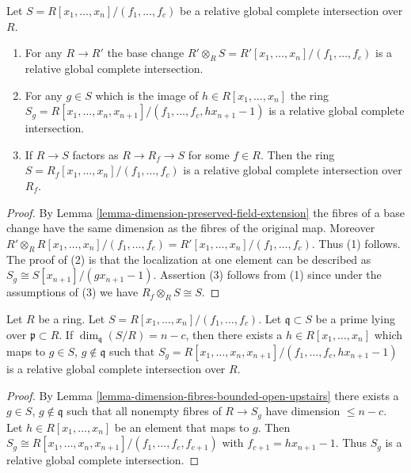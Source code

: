 \begin{lemma}
\label{lemma-base-change-relative-global-complete-intersection}
Let $S = R[x_1, \ldots, x_n]/(f_1, \ldots, f_c)$ be a
relative global complete intersection over $R$.
\begin{enumerate}
\item For any $R \to R'$ the base change
$R' \otimes_R S = R'[x_1, \ldots, x_n]/(f_1, \ldots, f_c)$ is a relative
global complete intersection.
\item For any $g \in S$ which is the image of $h \in R[x_1, \ldots, x_n]$
the ring
$S_g = R[x_1, \ldots, x_n, x_{n + 1}]/(f_1, \ldots, f_c, hx_{n + 1} - 1)$
is a relative global complete intersection.
\item If $R \to S$ factors as $R \to R_f \to S$ for some $f \in R$.
Then the ring $S = R_f[x_1, \ldots, x_n]/(f_1, \ldots, f_c)$
is a relative global complete intersection over $R_f$.
\end{enumerate}
\end{lemma}

\begin{proof}
By Lemma \ref{lemma-dimension-preserved-field-extension}
the fibres of a base change have the same dimension as the
fibres of the original map. Moreover
$R' \otimes_R R[x_1, \ldots, x_n]/(f_1, \ldots, f_c)
= R'[x_1, \ldots, x_n]/(f_1, \ldots, f_c)$. Thus (1) follows.
The proof of (2) is that
the localization at one element can be described as
$S_g \cong S[x_{n + 1}]/(gx_{n + 1} - 1)$.
Assertion (3) follows from (1) since under the assumptions of (3) we have
$R_f \otimes_R S \cong S$.
\end{proof}

\begin{lemma}
\label{lemma-localize-relative-complete-intersection}
Let $R$ be a ring.
Let $S = R[x_1, \ldots, x_n]/(f_1, \ldots, f_c)$.
Let $\mathfrak q \subset S$ be a prime lying over $\mathfrak p \subset R$.
If $\dim_{\mathfrak q}(S/R) = n - c$, then there
exists a $h \in R[x_1, \ldots, x_n]$ which maps to $g \in S$,
$g \not \in \mathfrak q$ such that
$S_g = R[x_1, \ldots, x_n, x_{n + 1}]/(f_1, \ldots, f_c, hx_{n + 1} - 1)$
is a relative global complete intersection over $R$.
\end{lemma}

\begin{proof}
By Lemma \ref{lemma-dimension-fibres-bounded-open-upstairs}
there exists a $g \in S$, $g \not \in \mathfrak q$
such that all nonempty fibres of $R \to S_g$
have dimension $\leq n - c$. Let $h \in R[x_1, \ldots, x_n]$
be an element that maps to $g$.
Then $S_g \cong R[x_1, \ldots, x_n, x_{n + 1}]/(f_1, \ldots, f_c, f_{c + 1})$
with $f_{c + 1} = h x_{n + 1} - 1$. Thus $S_g$ is a 
relative global complete intersection.
\end{proof}

